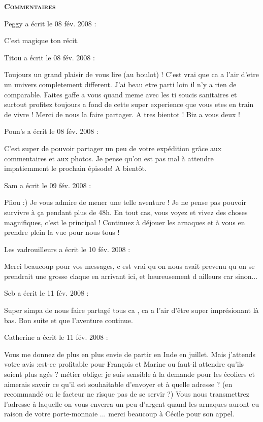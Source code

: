 \bigskip
\textbf{\textsc{Commentaires}}

 \medskip
Peggy a écrit le 08 fév. 2008 :
\begin{displayquote}
C'est magique ton récit.
\end{displayquote}

 \medskip
Titou a écrit le 08 fév. 2008 :
\begin{displayquote}
Toujours un grand plaisir de vous lire (au boulot) ! C'est vrai que ca a l'air d'etre un univers completement different. J'ai beau etre parti loin il n'y a rien de comparable. Faites gaffe a vous quand meme avec les ti soucis sanitaires et surtout profitez toujours a fond de cette super experience que vous etes en train de vivre ! Merci de nous la faire partager. A tres bientot ! Biz a vous deux !
\end{displayquote}

 \medskip
Poun's a écrit le 08 fév. 2008 :
\begin{displayquote}
C'est super de pouvoir partager un peu de votre expédition grâce aux commentaires et aux photos. Je pense qu'on est pas mal à attendre impatiemment le prochain épisode!
A bientôt.
\end{displayquote}

 \medskip
Sam a écrit le 09 fév. 2008 :
\begin{displayquote}
Pfiou :) Je vous admire de mener une telle aventure ! Je ne pense pas pouvoir survivre à ça pendant plus de 48h.
En tout cas, vous voyez et vivez des choses magnifiques, c'est le principal ! Continuez à déjouer les arnaques et à vous en prendre plein la vue pour nous tous !
\end{displayquote}

 \medskip
Les vadrouilleurs a écrit le 10 fév. 2008 :
\begin{displayquote}
Merci beaucoup pour vos messages, c est vrai qu on nous avait prevenu qu on se prendrait une grosse claque en arrivant ici, et heureusement d ailleurs car sinon...
\end{displayquote}

 \medskip
Seb a écrit le 11 fév. 2008 :
\begin{displayquote}
Super simpa de nous faire partagé tous ca , ca a l'air d'être super imprésionant là bas.
Bon suite et que l'aventure continue.
\end{displayquote}

 \medskip
Catherine a écrit le 11 fév. 2008 :
\begin{displayquote}
Vous me donnez de plus en plus envie de partir en Inde en juillet. Mais j'attends votre avis :est-ce profitable pour François et Marine ou faut-il attendre qu'ils soient plus agés ?
        métier oblige: je suis sensible à la demande pour les écoliers et aimerais savoir ce qu'il est souhaitable d'envoyer et à quelle adresse ? (en recommandé ou le facteur ne risque pas de se servir ?)
        Vous nous transmettrez l'adresse à laquelle on vous enverra un peu d'argent quand les arnaques auront eu raison de votre porte-monnaie ...
                merci beaucoup à Cécile pour son appel.
\end{displayquote}

